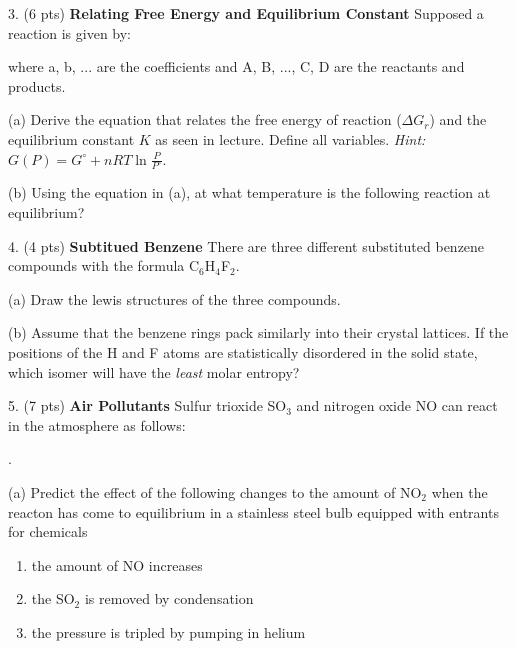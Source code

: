 \documentclass[11pt]{article}
\begin{document}
\vspace{3in}

3. (6 pts) \textbf{Relating Free Energy and Equilibrium Constant} Supposed a reaction
is given by:
\begin{center}
\end{center}
where a, b, ... are the coefficients and A, B, ..., C, D are the reactants and products.

(a) Derive the equation that relates the free energy of reaction ($\Delta G_r$) and the
equilibrium constant $K$ as seen in lecture. Define all variables. \textit{Hint:}
$G(P) = G^\circ + nRT \ln\frac{P}{P^\circ}$.

(b) Using the equation in (a), at what temperature is the following reaction at equilibrium?
\begin{center}
\end{center}


\vspace{3in}

%
%

4. (4 pts) \textbf{Subtitued Benzene} There are three different substituted benzene compounds
with the formula C$_6$H$_4$F$_2$.

(a) Draw the lewis structures of the three compounds.

(b) Assume that the benzene rings pack similarly into their crystal lattices. If the positions
of the H and F atoms are statistically disordered in the solid state, which isomer will have
the \textit{least} molar entropy?

\vspace{3in}

5. (7 pts) \textbf{Air Pollutants} Sulfur trioxide SO$_3$ and nitrogen oxide NO can react in
the atmosphere as follows:
\begin{center}
  .
\end{center}
(a) Predict the effect of the following changes to the amount of NO$_2$ when the reacton
has come to equilibrium in a stainless steel bulb equipped with entrants for chemicals
\begin{enumerate}
\item the amount of NO increases
\item the SO$_2$ is removed by condensation
\item the pressure is tripled by pumping in helium
\end{enumerate}
\end{document}
